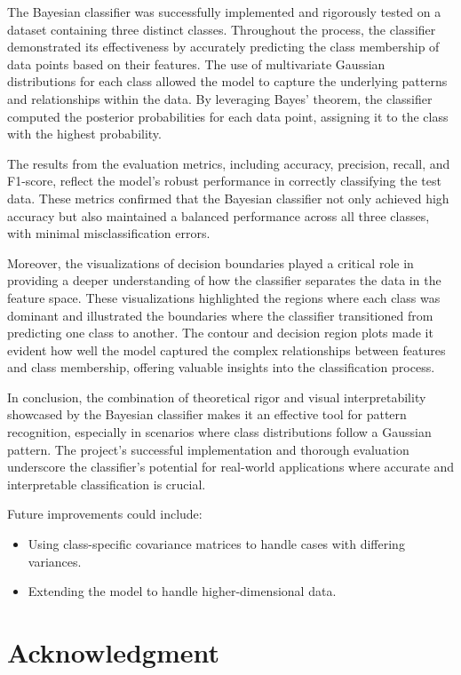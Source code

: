 \documentclass[conference]{IEEEtran}
\begin{document}
The Bayesian classifier was successfully implemented and rigorously tested on a dataset containing three distinct classes. Throughout the process, the classifier demonstrated its effectiveness by accurately predicting the class membership of data points based on their features. The use of multivariate Gaussian distributions for each class allowed the model to capture the underlying patterns and relationships within the data. By leveraging Bayes' theorem, the classifier computed the posterior probabilities for each data point, assigning it to the class with the highest probability.

The results from the evaluation metrics, including accuracy, precision, recall, and F1-score, reflect the model's robust performance in correctly classifying the test data. These metrics confirmed that the Bayesian classifier not only achieved high accuracy but also maintained a balanced performance across all three classes, with minimal misclassification errors.

Moreover, the visualizations of decision boundaries played a critical role in providing a deeper understanding of how the classifier separates the data in the feature space. These visualizations highlighted the regions where each class was dominant and illustrated the boundaries where the classifier transitioned from predicting one class to another. The contour and decision region plots made it evident how well the model captured the complex relationships between features and class membership, offering valuable insights into the classification process.

In conclusion, the combination of theoretical rigor and visual interpretability showcased by the Bayesian classifier makes it an effective tool for pattern recognition, especially in scenarios where class distributions follow a Gaussian pattern. The project's successful implementation and thorough evaluation underscore the classifier’s potential for real-world applications where accurate and interpretable classification is crucial.

Future improvements could include:
\begin{itemize}
\item Using class-specific covariance matrices to handle cases with differing variances.
\item Extending the model to handle higher-dimensional data.
\end{itemize}

\section*{Acknowledgment}
\end{document}
